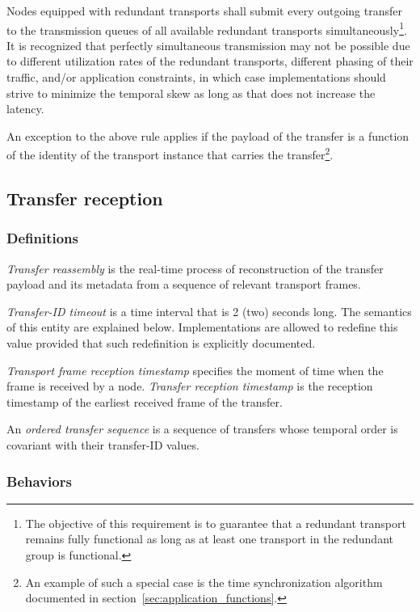 Nodes equipped with redundant transports shall submit every outgoing transfer to the transmission queues of all
available redundant transports simultaneously\footnote{%
    The objective of this requirement is to guarantee that a redundant transport remains fully functional
    as long as at least one transport in the redundant group is functional.
}.
It is recognized that perfectly simultaneous transmission may not be possible due to different
utilization rates of the redundant transports, different phasing of their traffic, and/or application constraints,
in which case implementations should strive to minimize the temporal skew as long as that
does not increase the latency.

An exception to the above rule applies if the payload of the transfer is a function of
the identity of the transport instance that carries the transfer\footnote{%
    An example of such a special case is the time synchronization algorithm documented
    in section~\ref{sec:application_functions}.
}.

\subsection{Transfer reception}

\subsubsection{Definitions}

\emph{Transfer reassembly} is the real-time process of reconstruction of the transfer payload and its metadata from
a sequence of relevant transport frames.

\emph{Transfer-ID timeout} is a time interval that is 2 (two) seconds long.
The semantics of this entity are explained below.
Implementations are allowed to redefine this value provided that such redefinition is explicitly documented.

\emph{Transport frame reception timestamp} specifies the moment of time when the frame is received by a node.
\emph{Transfer reception timestamp} is the reception timestamp of the earliest received frame of the transfer.

An \emph{ordered transfer sequence} is a sequence of transfers whose temporal order is
covariant with their transfer-ID values.

\subsubsection{Behaviors}

